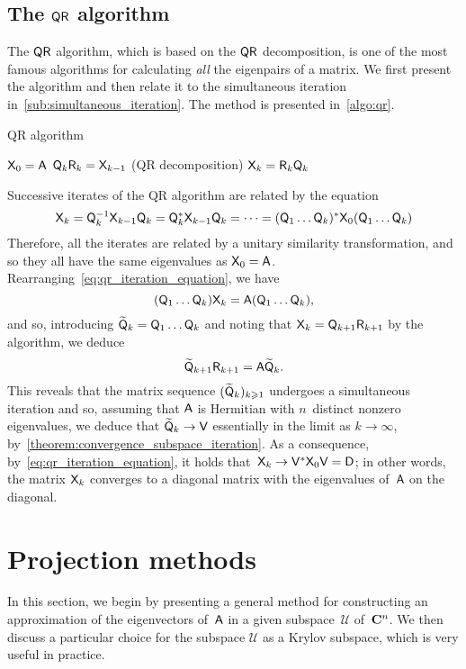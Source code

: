 \subsection{The $\mathsf Q \mathsf R$ algorithm}
The $\mathsf Q \mathsf R$ algorithm,
which is based on the $\mathsf Q \mathsf R$ decomposition,
is one of the most famous algorithms for calculating \emph{all} the eigenpairs of a matrix.
We first present the algorithm and then relate it to the simultaneous iteration in~\cref{sub:simultaneous_iteration}.
The method is presented in~\cref{algo:qr}.
\begin{algorithm}
\caption{QR algorithm}%
\label{algo:qr}%
\begin{algorithmic}
\State $\mathsf X_0 = \mathsf A$
    \State $\mathsf Q_k \mathsf R_k = \mathsf X_{k-1}$ (QR decomposition)
    \State $\mathsf X_{k} = \mathsf R_k \mathsf Q_k$
\EndFor
\end{algorithmic}
\end{algorithm}

Successive iterates of the QR algorithm are related by the equation
\begin{equation}
    \label{eq:qr_iteration_equation}
    \mathsf X_{k} = \mathsf Q_k^{-1}  \mathsf X_{k-1} \mathsf Q_k
    = \mathsf Q_k^* \mathsf X_{k-1} \mathsf Q_k
    = \dots = (\mathsf Q_1 \dots \mathsf Q_k)^* \mathsf X_{0} (\mathsf Q_1 \dots \mathsf Q_k)
\end{equation}
Therefore, all the iterates are related by a unitary similarity transformation,
and so they all have the same eigenvalues as $\mathsf X_0 = \mathsf A$.
Rearranging~\eqref{eq:qr_iteration_equation},
we have
\[
    (\mathsf Q_1 \dots \mathsf Q_k) \mathsf X_{k} = \mathsf A (\mathsf Q_1 \dots \mathsf Q_k),
\]
and so, introducing $\widetilde {\mathsf Q}_k = \mathsf Q_1 \dots \mathsf Q_k$
and noting that $\mathsf X_k = \mathsf Q_{k+1} \mathsf R_{k+1}$ by the algorithm,
we deduce
\[
    \widetilde {\mathsf Q}_{k+1} \mathsf R_{k+1} = \mathsf A \widetilde {\mathsf Q}_k.
\]
This reveals that
the matrix sequence $(\widetilde{\mathsf Q}_{k})_{k\geqslant 1}$ undergoes a simultaneous iteration and so,
assuming that $\mathsf A$ is Hermitian with $n$~distinct nonzero eigenvalues,
we deduce that $\widetilde{\mathsf Q}_k \to \mathsf V$ essentially in the limit as $k \to \infty$,
by~\cref{theorem:convergence_subspace_iteration}.
As a consequence, by~\eqref{eq:qr_iteration_equation},
it holds that~$\mathsf X_k \to \mathsf V^* \mathsf X_0 \mathsf V = \mathsf D$;
in other words, the matrix $\mathsf X_k$ converges to a diagonal matrix with the eigenvalues of~$\mathsf A$ on the diagonal.

\section{Projection methods}
\label{sec:projection_methods}
In this section,
we begin by presenting a general method for constructing an approximation of the eigenvectors of~$\mathsf A$ in a given subspace~$\mathcal U$ of~$\mathbf C^{n}$.
We then discuss a particular choice for the subspace $\mathcal U$
as a Krylov subspace, which is very useful in practice.

